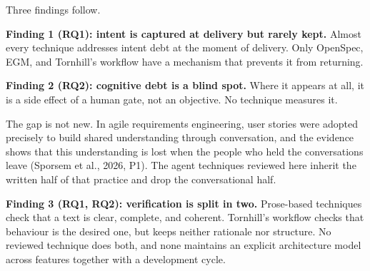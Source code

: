 \documentclass[11pt]{article}
\begin{document}
Three findings follow.

\textbf{Finding 1 (RQ1): intent is captured at delivery but rarely kept.} Almost every technique addresses intent debt at the moment of delivery. Only OpenSpec, EGM, and Tornhill's workflow have a mechanism that prevents it from returning.

\textbf{Finding 2 (RQ2): cognitive debt is a blind spot.} Where it appears at all, it is a side effect of a human gate, not an objective. No technique measures it.

The gap is not new. In agile requirements engineering, user stories were adopted precisely to build shared understanding through conversation, and the evidence shows that this understanding is lost when the people who held the conversations leave (Sporsem et al., 2026, P1). The agent techniques reviewed here inherit the written half of that practice and drop the conversational half.

\textbf{Finding 3 (RQ1, RQ2): verification is split in two.} Prose-based techniques check that a text is clear, complete, and coherent. Tornhill's workflow checks that behaviour is the desired one, but keeps neither rationale nor structure. No reviewed technique does both, and none maintains an explicit architecture model across features together with a development cycle.
\end{document}
